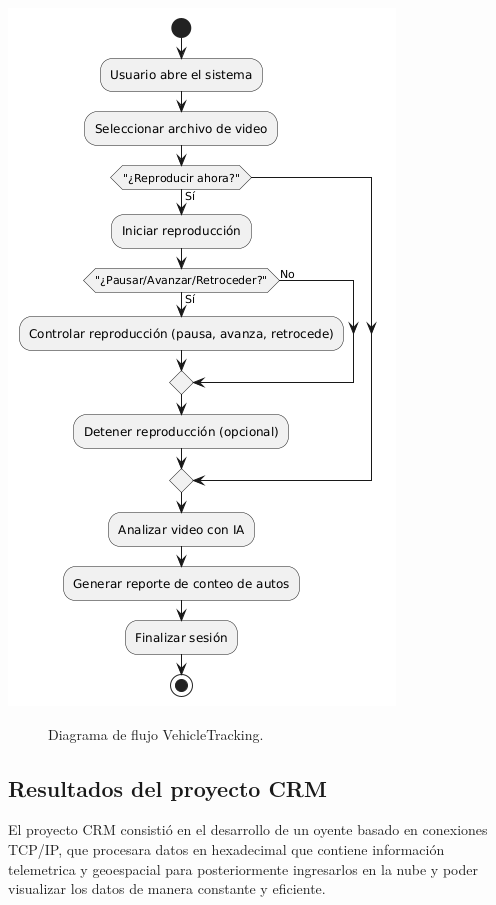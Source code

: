 \documentclass[protocolo.tex]{subfiles}
\begin{document}
\begin{center}
\includegraphics[scale=0.5]{Imagenes/vehicleTracking.png}
\end{center}
\begin{figure}[h]  %
    \centering
    \caption{Diagrama de flujo VehicleTracking.}
    \label{fig:mi-figura2}
\end{figure}

\subsection{Resultados del proyecto CRM}

El proyecto CRM consistió en el desarrollo de un oyente basado en conexiones TCP/IP, que procesara datos en hexadecimal que contiene información telemetrica y geoespacial para posteriormente ingresarlos en la nube y poder visualizar los datos de manera constante y eficiente. \vspace{4mm}
\end{document}
